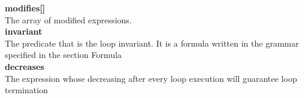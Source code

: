 \textbf{   modifies[]} \\
    The array of modified expressions.\\

\textbf{  invariant } \\
    The predicate that is the loop invariant. It is a formula written in the grammar specified in the section Formula\\

\textbf{  decreases } \\
    The expression whose decreasing after every loop execution will guarantee loop termination 



%


